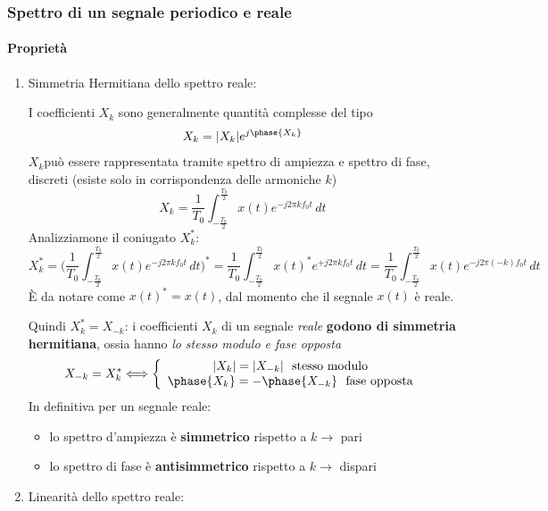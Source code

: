 \documentclass[
]{article}
\providecommand{\tightlist}{%
  \setlength{\itemsep}{0pt}\setlength{\parskip}{0pt}}
\begin{document}
\subsubsection{Spettro di un segnale periodico e
reale}\label{spettro-di-un-segnale-periodico-e-reale}

\paragraph{Proprietà}\label{proprietuxe0}

\begin{enumerate}
\def\labelenumi{\arabic{enumi}.}
\setcounter{enumi}{5}
\item
  Simmetria Hermitiana dello spettro reale:

  I coefficienti \(X_k\) sono generalmente quantità complesse del tipo
  \begin{gather*}
   X_k = |X_{k}|e^{j\phase{X_{k}}}
   \end{gather*} \(X_{k}\)può essere rappresentata tramite spettro di
  ampiezza e spettro di fase, discreti (esiste solo in corrispondenza
  delle armoniche \(k\)) \[
   X_k = \frac{1}{T_0} \int_{-\frac{T_0}{2}}^{\frac{T_0}{2}} x(t) e^{-j2\pi kf_{0}t} \,dt
   \] Analizziamone il coniugato \(X^{*}_{k}\): \[
   X_k^{*} = \Big(\frac{1}{T_0} \int_{-\frac{T_0}{2}}^{\frac{T_0}{2}} x(t) e^{-j2\pi kf_{0}t} \,dt \Big)^{*} = \frac{1}{T_0} \int_{-\frac{T_0}{2}}^{\frac{T_0}{2}} x(t)^{*} e^{+j2\pi kf_{0}t} \,dt = \frac{1}{T_0} \int_{-\frac{T_0}{2}}^{\frac{T_0}{2}} x(t) e^{-j2\pi (-k)f_{0}t} \,dt
   \] È da notare come \(x(t)^{*}=x(t)\), dal momento che il segnale
  \(x(t)\) è reale.

  Quindi \(X_{k}^{*}=X_{-k}\): i coefficienti \(X_k\) di un segnale
  \emph{reale} \textbf{godono di simmetria hermitiana}, ossia hanno
  \emph{lo stesso modulo e fase opposta} \[
   X_{-k}=X_{k}^{*} \Longleftrightarrow \left\{ \begin{array}{cl}
   |X_k|=|X_{-k}| \ \text{ stesso modulo}  \\
   \phase{X_{k}} = -\phase{X_{-k}} \ \text{ fase opposta}
   \end{array} \right.
   \] In definitiva per un segnale reale:

  \begin{itemize}
  \tightlist
  \item
    lo spettro d'ampiezza è \textbf{simmetrico} rispetto a \(k \to\)
    pari
  \item
    lo spettro di fase è \textbf{antisimmetrico} rispetto a \(k \to\)
    dispari
  \end{itemize}
\item
  Linearità dello spettro reale:


\end{enumerate}
\end{document}
